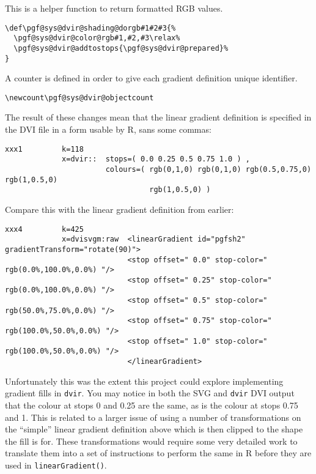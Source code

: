 \documentclass[]{article}
\begin{document}
This is a helper function to return formatted RGB values.

\begin{verbatim}
\def\pgf@sys@dvir@shading@dorgb#1#2#3{%
  \pgf@sys@dvir@color@rgb#1,#2,#3\relax%
  \pgf@sys@dvir@addtostops{\pgf@sys@dvir@prepared}%
}
\end{verbatim}

A counter is defined in order to give each gradient definition unique
identifier.

\begin{verbatim}
\newcount\pgf@sys@dvir@objectcount
\end{verbatim}

The result of these changes mean that the linear gradient definition is
specified in the DVI file in a form usable by R, sans some commas:

\begin{verbatim}
xxx1         k=118
             x=dvir::  stops=( 0.0 0.25 0.5 0.75 1.0 ) , 
                       colours=( rgb(0,1,0) rgb(0,1,0) rgb(0.5,0.75,0) rgb(1,0.5,0) 
                                 rgb(1,0.5,0) )
\end{verbatim}

Compare this with the linear gradient definition from earlier:

\begin{verbatim}
xxx4         k=425
             x=dvisvgm:raw  <linearGradient id="pgfsh2" gradientTransform="rotate(90)">
                            <stop offset=" 0.0" stop-color=" rgb(0.0%,100.0%,0.0%) "/>
                            <stop offset=" 0.25" stop-color=" rgb(0.0%,100.0%,0.0%) "/>
                            <stop offset=" 0.5" stop-color=" rgb(50.0%,75.0%,0.0%) "/>
                            <stop offset=" 0.75" stop-color=" rgb(100.0%,50.0%,0.0%) "/>
                            <stop offset=" 1.0" stop-color=" rgb(100.0%,50.0%,0.0%) "/>
                            </linearGradient>
\end{verbatim}

Unfortunately this was the extent this project could explore
implementing \Tikz{} gradient fills in \texttt{dvir}. You may notice in
both the SVG and \texttt{dvir} DVI output that the colour at stops 0 and
0.25 are the same, as is the colour at stops 0.75 and 1. This is related
to a larger issue of \Tikz{} using a number of transformations on the
``simple'' linear gradient definition above which is then clipped to the
shape the fill is for. These transformations would require some very
detailed work to translate them into a set of instructions to perform
the same in R before they are used in \texttt{linearGradient()}.
\end{document}
